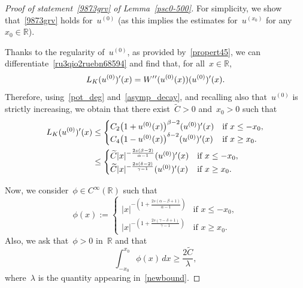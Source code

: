 \documentclass[10pt,a4paper]{amsart}
\numberwithin{equation}{section}
\newcommand{\R}{\mathbb{R}}
\begin{document}
\begin{proof}[Proof of statement~\eqref{9873grv} of Lemma~\ref{psc0-500}]
For simplicity, we show that~\eqref{9873grv} holds for~$u^{(0)}$
(as this implies the estimates for~$u^{(x_0)}$ for any~$x_0\in\R$).

Thanks to the regularity of~$u^{(0)}$, as provided by~\eqref{propert45},
we can differentiate~\eqref{ru3qio2ruebn68594} and find that, for all~$x\in\R$,
$$ {L}_K (u^{(0)})\rq{}(x) = W\rq{}\rq{}(u^{(0)}(x))  (u^{(0)})\rq{} (x).$$
Therefore, using~\eqref{pot_deg} and~\eqref{asymp_decay}, and recalling also that~$u^{(0)}$ is strictly increasing,
we obtain that there exist~$\widetilde{C}>0$ and~$x_0>0$ such that
\begin{equation}\label{90377djoi}
\begin{split}
L_K ( u^{(0)})\rq{}(x) &\leq
\begin{cases}C_2 \big(1+u^{(0)}(x)\big)^{\beta-2}(u^{(0)})\rq{}(x) &\mbox{if } x\leq -x_0, \\
C_4\big(1-u^{(0)}(x)\big)^{\delta-2}(u^{(0)})\rq{}(x) &\mbox{if } x\geq x_0.
\end{cases}\\
&\leq \begin{cases}
\widetilde{C} |x |^{-\frac{2s(\beta-2)}{\alpha-1}}(u^{(0)})\rq{}(x) &\mbox{if } x\leq -x_0,\\
\widetilde{C}|x |^{-\frac{2s(\delta-2)}{\gamma-1}}(u^{(0)})\rq{}(x) &\mbox{if } x\geq x_0.
\end{cases}
\end{split}
\end{equation}

Now, we consider~$\phi \in C^{\infty}(\R)$ such that
\begin{equation}\label{3wertyjxsdcvb0ffdj88}
\phi(x) := \begin{cases}
|x |^{-\left(1+\frac{2s(\alpha-\beta+1)}{\alpha-1}\right)}  &\mbox{if } x \leq -x_0, \\
|x |^{-\left(1+\frac{2s(\gamma-\delta+1)}{\gamma-1}\right)}  &\mbox{if } x \geq x_0.
\end{cases}
\end{equation}
Also, we ask that~$\phi >0$ in~$\R$ and that 
\begin{equation*}
\int_{-x_0}^{x_0} \phi(x) \, dx \geq \frac{2\widetilde{C}}{\lambda},
\end{equation*}
where~$\lambda$ is the quantity appearing in~\eqref{newbound}.


\end{proof}
\end{document}
